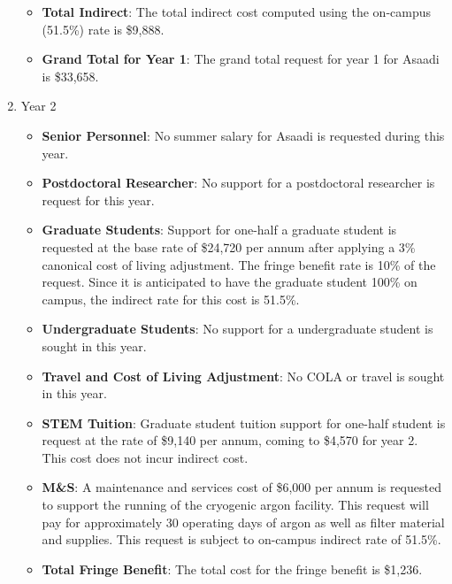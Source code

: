 \begin{enumerate}
\begin{itemize}[noitemsep,nolistsep]
\item {{\bf Total Indirect}: The total indirect cost computed using the on-campus (51.5\%) rate is \$9,888.}

\item {{\bf Grand Total for Year 1}: The grand total request for year 1 for Asaadi is \$33,658.}

\end{itemize}

\item{Year 2}
\begin{itemize}[noitemsep,nolistsep]

\item{{\bf Senior Personnel}: No summer salary for Asaadi is requested during this year.}

\item {{\bf Postdoctoral Researcher}: No support for a postdoctoral researcher is request for this year.} 

\item{{\bf Graduate Students}: Support for one-half a graduate student is requested at the base rate of \$24,720 per annum after applying a 3\% canonical cost of living adjustment.   The fringe benefit rate is 10\% of the request.  Since it is anticipated to have the graduate student 100\% on campus, the indirect rate for this cost is 51.5\%.}

\item {{\bf Undergraduate Students}: No support for a undergraduate student is sought in this year.}

\item{{\bf Travel and Cost of Living Adjustment}: No COLA or travel is sought in this year.}

\item {{\bf STEM Tuition}: Graduate student tuition support for one-half student is request at the rate of \$9,140 per annum, coming to \$4,570 for year 2.  This cost does not incur indirect cost.}

\item {{\bf M\&S}: A maintenance and services cost of \$6,000 per annum is requested to support the running of the cryogenic argon facility. This request will pay for approximately 30 operating days of argon as well as filter material and supplies.    This request is subject to on-campus indirect rate of 51.5\%.}

\item {{\bf Total Fringe Benefit}: The total cost for the fringe benefit is \$1,236.}


\end{itemize}
\end{enumerate}
